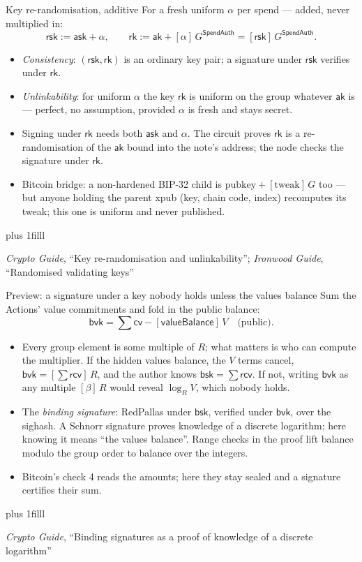 \documentclass[aspectratio=169,11pt]{beamer}
\newcommand{\cvsym}{\ensuremath{\mathsf{cv}}}
\newcommand{\rksym}{\ensuremath{\mathsf{rk}}}
\newcommand{\aksym}{\ensuremath{\mathsf{ak}}}
\newcommand{\asksym}{\ensuremath{\mathsf{ask}}}
\newcommand{\rcv}{\ensuremath{\mathsf{rcv}}}
\newcommand{\rsk}{\ensuremath{\mathsf{rsk}}}
\newcommand{\src}[1]{\par\vskip0pt plus 1filll
  {\fontsize{6}{7.2}\selectfont\color{arbdim}\raggedright #1\par}}
\begin{document}
\begin{frame}{Key re-randomisation, additive}
For a fresh uniform $\alpha$ per spend --- added, never multiplied in:
\[
  \rsk := \asksym + \alpha, \qquad
  \rksym := \aksym + [\alpha]\,G^{\mathsf{SpendAuth}}
    = [\rsk]\,G^{\mathsf{SpendAuth}} .
\]
\begin{itemize}
  \item \emph{Consistency}: $(\rsk, \rksym)$ is an ordinary key pair; a
    signature under $\rsk$ verifies under $\rksym$.
  \item \emph{Unlinkability}: for uniform $\alpha$ the key $\rksym$ is
    uniform on the group whatever $\aksym$ is --- perfect, no assumption,
    provided $\alpha$ is fresh and stays secret.
  \item Signing under $\rksym$ needs both $\asksym$ and $\alpha$. The
    circuit proves $\rksym$ is a re-randomisation of the $\aksym$ bound
    into the note's address; the node checks the signature under $\rksym$.
  \item Bitcoin bridge: a non-hardened BIP-32 child is
    $\text{pubkey} + [\text{tweak}]\,G$ too --- but anyone holding the
    parent xpub (key, chain code, index) recomputes its tweak; this one is
    uniform and never published.
\end{itemize}
\src{\emph{Crypto Guide}, ``Key re-randomisation and unlinkability'';
  \emph{Ironwood Guide}, ``Randomised validating keys''}
\end{frame}

\begin{frame}{Preview: a signature under a key nobody holds unless the
  values balance}
\small
\setlength{\abovedisplayskip}{2pt}\setlength{\belowdisplayskip}{2pt}
Sum the Actions' value commitments and fold in the public balance:
\[
  \mathsf{bvk} = \sum \cvsym - [\mathsf{valueBalance}]\,V
  \quad\text{(public)}.
\]
\begin{itemize}\setlength{\itemsep}{2pt}
  \item Every group element is some multiple of $R$; what matters is who
    can compute the multiplier. If the hidden values balance, the $V$ terms
    cancel, $\mathsf{bvk} = [\sum \rcv]\,R$, and the author knows
    $\mathsf{bsk} = \sum \rcv$. If not, writing $\mathsf{bvk}$ as any
    multiple $[\beta]\,R$ would reveal $\log_{R} V$, which nobody holds.
  \item The \emph{binding signature}: RedPallas under $\mathsf{bsk}$,
    verified under $\mathsf{bvk}$, over the sighash. A Schnorr signature
    proves knowledge of a discrete logarithm; here knowing it means ``the
    values balance''. Range checks in the proof lift balance modulo the
    group order to balance over the integers.
  \item Bitcoin's check 4 reads the amounts; here they stay sealed and a
    signature certifies their sum.
\end{itemize}
\src{\emph{Crypto Guide}, ``Binding signatures as a proof of knowledge of a
  discrete logarithm''}
\end{frame}
\end{document}
